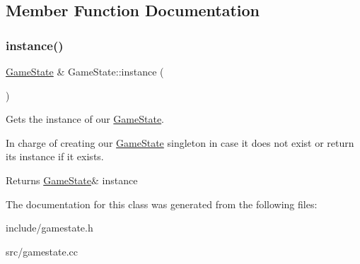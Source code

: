 \subsection{Member Function Documentation}
\mbox{\label{class_game_state_a1429b5b681e581c11a11f19e28968cd9}} 
\subsubsection{\texorpdfstring{instance()}{instance()}}
{\footnotesize\ttfamily \mbox{\hyperlink{class_game_state}{Game\+State}} \& Game\+State\+::instance (\begin{DoxyParamCaption}{ }\end{DoxyParamCaption})\hspace{0.3cm}{\ttfamily [static]}}



Gets the instance of our \mbox{\hyperlink{class_game_state}{Game\+State}}. 

In charge of creating our \mbox{\hyperlink{class_game_state}{Game\+State}} singleton in case it does not exist or return its instance if it exists.

\begin{DoxyReturn}{Returns}
\mbox{\hyperlink{class_game_state}{Game\+State}}\& instance 
\end{DoxyReturn}


The documentation for this class was generated from the following files\+:\begin{DoxyCompactItemize}
\item 
include/gamestate.\+h\item 
src/gamestate.\+cc\end{DoxyCompactItemize}
